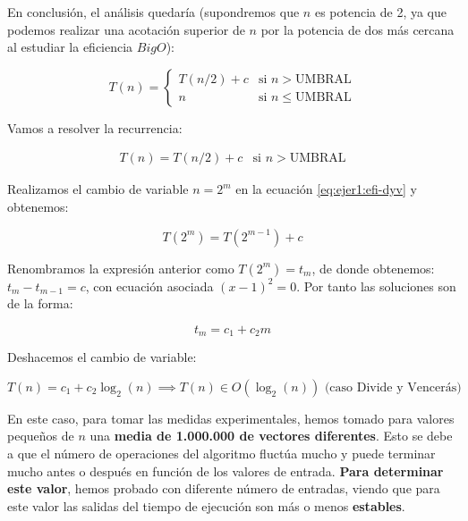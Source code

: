 En conclusión, el análisis quedaría (supondremos que $n$ es potencia de 2, ya que podemos realizar una acotación 
superior de $n$ por la potencia de dos más cercana al estudiar la eficiencia $Big O$): 

\begin{equation}
    T(n) = \left\{ \begin{array}{lr} T(n/2) + c & \text{si } n > \text{UMBRAL}\\ n & \text{si } n \leqslant \text{UMBRAL} \end{array} \right.
    \label{eq:1a-efi-dyv-rec}
\end{equation}

Vamos a resolver la recurrencia:

\begin{equation}
    \begin{array}{lr}  T(n) =  T(n/2) + c & \text{si } n > \text{UMBRAL} \end{array}
    \label{eq:ejer1:efi-dyv}
\end{equation}

Realizamos el cambio de variable $n = 2^{m}$ en la ecuación \ref{eq:ejer1:efi-dyv} y obtenemos:

\begin{equation*}
    T(2^{m}) =  T(2^{m-1}) + c 
\end{equation*}

Renombramos la expresión anterior como $T(2^{m}) = t_{m}$, de donde obtenemos: $t_{m} - t_{m-1} = c$, con
ecuación asociada $(x-1)^{2} = 0$. Por tanto las soluciones son de la forma: 

\begin{equation*}
    t_{m} = c_{1} + c_{2}m
\end{equation*}

Deshacemos el cambio de variable:

\begin{equation}
    T(n) = c_{1} + c_{2} \log_2(n) \implies \boxed{T(n) \in O(\log_2(n))}
    \text{ (caso Divide y Vencerás)}
    \label{eq:1a-eficiencia-lineal}
\end{equation}

En este caso, para tomar las medidas experimentales, hemos tomado para valores pequeños de $n$ una 
\textbf{media de 1.000.000 de vectores diferentes}. Esto se debe a que el número de operaciones del 
algoritmo fluctúa mucho y puede terminar mucho antes o después en función
de los valores de entrada. \textbf{Para determinar este valor}, hemos probado con diferente número de entradas, 
viendo que para este valor las salidas del tiempo de ejecución son más o menos \textbf{estables}. 

